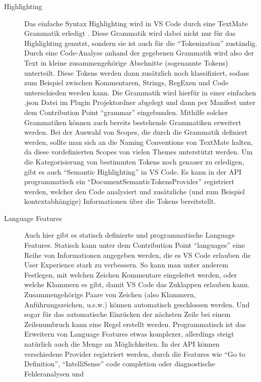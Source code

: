   \begin{description}
    \item[Highlighting] 
      Das einfache Syntax Highlighting wird in VS Code durch eine TextMate Grammatik erledigt \cite{TextMateGrammar}.
      Diese Grammatik wird dabei nicht nur für das Highlighting genutzt, sondern sie ist auch für die \enquote{Tokenization}
      zuständig. Durch eine Code-Analyse anhand der gegebenen Grammatik wird also der Text in kleine 
      zusammengehörige Abschnitte (sogenannte Tokens) unterteilt. Diese Tokens werden dann zusätzlich noch 
      klassifiziert, sodass zum Beispiel zwischen Kommentaren, Strings, RegExen und Code unterschieden werden kann.
      Die Grammatik wird hierfür in einer einfachen .json Datei im Plugin Projektordner abgelegt und dann per Manifest
      unter dem Contribution Point \enquote{grammar} eingebunden. Mithilfe solcher Grammatiken können auch bereits bestehende
      Grammatiken erweitert werden. Bei der Auswahl von Scopes, die durch die Grammatik definiert werden, sollte man sich
      an die Naming Conventions von TextMate halten, da diese vordefinierten Scopes von vielen Themes unterstützt werden.
      Um die Kategorisierung von bestimmten Tokens noch genauer zu erledigen, gibt es auch \enquote{Semantic Highlighting} 
      in VS Code. Es kann in der API programmatisch ein \enquote{DocumentSemanticTokensProvider} registriert werden,
      welcher den Code analysiert und zusätzliche (und zum Beispiel kontextabhängige) Informationen über die Tokens bereitstellt.
    \item[Language Features] 
      Auch hier gibt es statisch definierte und programmatische Language Features.
      Statisch kann unter dem Contribution Point \enquote{languages} eine Reihe von Informationen angegeben werden,
      die es VS Code erlauben die User Experience stark zu verbessern. So kann man unter anderem Festlegen,
      mit welchen Zeichen Kommentare eingeleitet werden, oder welche Klammern es gibt, damit VS Code das Zuklappen erlauben kann.
      Zusammengehörige Paare von Zeichen (also Klammern, Anführungszeichen, u.s.w.) können automatisch geschlossen werden.
      Und sogar für das automatische Einrücken der nächsten Zeile bei einem Zeilenumbruch kann eine Regel erstellt werden.
      Programmatisch ist das Erweitern von Language Features etwas komplexer, allerdings steigt natürlich auch die
      Menge an Möglichkeiten. In der API können verschiedene Provider registriert werden, durch die Features wie
      \enquote{Go to Definition}, \enquote{IntelliSense} code completion oder diagnostische Fehleranalysen und

\end{description}

